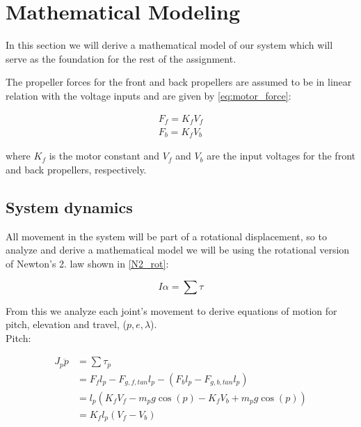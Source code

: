 \section{Mathematical Modeling}\label{sec:part1}

In this section we will derive a mathematical model of our system which will serve as the foundation for the rest of the assignment.

The propeller forces for the front and back propellers are assumed to be in linear relation with the voltage inputs and are given by \cref{eq:motor_force}:

\begin{subequations}\label{eq:motor_force}
    \begin{align}
        F_{f} = K_{f} V_{f} \label{eq:motor_force_front} \\
        F_{b} = K_{f} V_{b} \label{eq:motor_force_back}
    \end{align}
\end{subequations}

where $K_{f}$ is the motor constant and $V_{f}$ and $V_{b}$ are the input voltages for the front and back propellers, respectively.

\subsection{System dynamics}

All movement in the system will be part of a rotational displacement, so to analyze and derive a mathematical model we will be using the rotational version of Newton's 2. law shown in \cref{N2_rot}: 

\begin{equation}
    I \alpha = \sum \tau \label{N2_rot}
\end{equation}

From this we analyze each joint's movement to derive equations of motion for pitch, elevation and travel, ($p, e, \lambda$). \\

Pitch:

\begin{subequations}\label{eq:model_pitch_sol}
    \begin{aligned}
        J_{p} \ddot{p} &= \sum \tau_{p} \\
        &= F_{f} l_{p} - F_{g,f,tan} l_{p} - (F_{b} l_{p} - F_{g,b,tan} l_{p}) \\
        &= l_{p} (K_{f} V_{f} - m_{p} g \cos(p) - K_{f} V_{b} + m_{p} g \cos(p)) \\
        &= K_{f} l_{p} (V_{f} - V_{b})
    \end{aligned}
\end{subequations}

